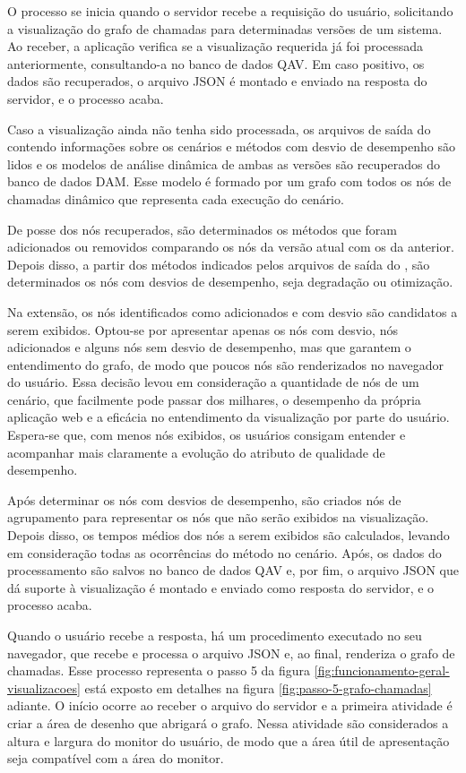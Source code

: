 O processo se inicia quando o servidor recebe a requisição do usuário, solicitando a visualização do grafo de chamadas para determinadas versões de um sistema. Ao receber, a aplicação verifica se a visualização requerida já foi processada anteriormente, consultando-a no banco de dados QAV. Em caso positivo, os dados são recuperados, o arquivo JSON é montado e enviado na resposta do servidor, e o processo acaba.

Caso a visualização ainda não tenha sido processada, os arquivos de saída do \textit{\perfMinerName} contendo informações sobre os cenários e métodos com desvio de desempenho são lidos e os modelos de análise dinâmica de ambas as versões são recuperados do banco de dados DAM. Esse modelo é formado por um grafo com todos os nós de chamadas dinâmico que representa cada execução do cenário.

De posse dos nós recuperados, são determinados os métodos que foram adicionados ou removidos comparando os nós da versão atual com os da anterior. Depois disso, a partir dos métodos indicados pelos arquivos de saída do \textit{\perfMinerName}, são determinados os nós com desvios de desempenho, seja degradação ou otimização.

Na extensão, os nós identificados como adicionados e com desvio são candidatos a serem exibidos. Optou-se por apresentar apenas os nós com desvio, nós adicionados e alguns nós sem desvio de desempenho, mas que garantem o entendimento do grafo, de modo que poucos nós são renderizados no navegador do usuário. Essa decisão levou em consideração a quantidade de nós de um cenário, que facilmente pode passar dos milhares, o desempenho da própria aplicação web e a eficácia no entendimento da visualização por parte do usuário. Espera-se que, com menos nós exibidos, os usuários consigam entender e acompanhar mais claramente a evolução do atributo de qualidade de desempenho.

Após determinar os nós com desvios de desempenho, são criados nós de agrupamento para representar os nós que não serão exibidos na visualização. Depois disso, os tempos médios dos nós a serem exibidos são calculados, levando em consideração todas as ocorrências do método no cenário. Após, os dados do processamento são salvos no banco de dados QAV e, por fim, o arquivo JSON que dá suporte à visualização é montado e enviado como resposta do servidor, e o processo acaba.

Quando o usuário recebe a resposta, há um procedimento executado no seu navegador, que recebe e processa o arquivo JSON e, ao final, renderiza o grafo de chamadas. Esse processo representa o passo 5 da figura \ref{fig:funcionamento-geral-visualizacoes} está exposto em detalhes na figura \ref{fig:passo-5-grafo-chamadas} adiante. O início ocorre ao receber o arquivo do servidor e a primeira atividade é criar a área de desenho que abrigará o grafo. Nessa atividade são considerados a altura e largura do monitor do usuário, de modo que a área útil de apresentação seja compatível com a área do monitor.

